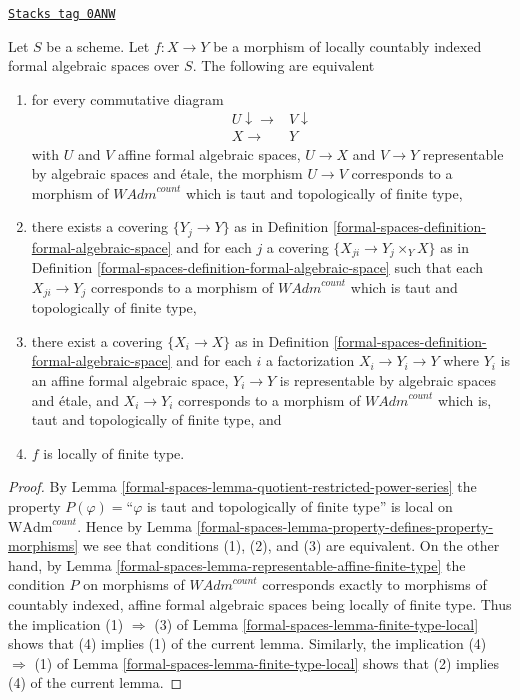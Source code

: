 \begin{lemma}
\label{formal-spaces-lemma-finite-type-local-property}
\href{https://stacks.math.columbia.edu/tag/0ANW}{\texttt{Stacks tag 0ANW}}

Let $S$ be a scheme. Let $f : X \to Y$ be a morphism of
locally countably indexed formal algebraic spaces over $S$.
The following are equivalent
\begin{enumerate}
\item for every commutative diagram
$$
\begin{array}{cc}U \downarrow\longrightarrow & V \downarrow \\ X \longrightarrow & Y\end{array}
$$
with $U$ and $V$ affine formal algebraic spaces, $U \to X$ and $V \to Y$
representable by algebraic spaces and \'etale, the morphism $U \to V$
corresponds to a morphism of $\textit{WAdm}^{count}$ which is
taut and topologically of finite type,
\item there exists a covering $\{Y_j \to Y\}$ as in
Definition \ref{formal-spaces-definition-formal-algebraic-space} and for each $j$
a covering $\{X_{ji} \to Y_j \times_Y X\}$ as in
Definition \ref{formal-spaces-definition-formal-algebraic-space}
such that each $X_{ji} \to Y_j$  corresponds
to a morphism of $\textit{WAdm}^{count}$ which is
taut and topologically of finite type,
\item there exist a covering $\{X_i \to X\}$ as in
Definition \ref{formal-spaces-definition-formal-algebraic-space}
and for each $i$ a factorization $X_i \to Y_i \to Y$ where $Y_i$
is an affine formal algebraic space, $Y_i \to Y$ is representable
by algebraic spaces and \'etale, and $X_i \to Y_i$ corresponds
to a morphism of $\textit{WAdm}^{count}$ which is,
taut and topologically of finite type, and
\item $f$ is locally of finite type.
\end{enumerate}
\end{lemma}

\begin{proof}
By Lemma \ref{formal-spaces-lemma-quotient-restricted-power-series}
the property
$P(\varphi)=$``$\varphi$ is taut and topologically of finite type''
is local on $\text{WAdm}^{count}$. Hence by
Lemma \ref{formal-spaces-lemma-property-defines-property-morphisms}
we see that conditions (1), (2), and (3) are equivalent.
On the other hand, by Lemma \ref{formal-spaces-lemma-representable-affine-finite-type}
the condition $P$ on morphisms of $\textit{WAdm}^{count}$
corresponds exactly to morphisms of countably indexed, affine
formal algebraic spaces being locally of finite type.
Thus the implication (1) $\Rightarrow$ (3) of
Lemma \ref{formal-spaces-lemma-finite-type-local}
shows that (4) implies (1) of the current lemma.
Similarly, the implication (4) $\Rightarrow$ (1) of
Lemma \ref{formal-spaces-lemma-finite-type-local}
shows that (2) implies (4) of the current lemma.
\end{proof}


